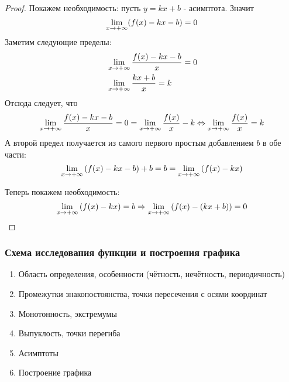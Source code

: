 \begin{proof}
	Покажем необходимость: пусть $y = kx + b$ - асимптота. Значит
	\[
		\lim\limits_{x \to +\infty} (f(x) - kx - b) = 0
	\]
	Заметим следующие пределы:
	\begin{align*}
		&\lim\limits_{x \to +\infty} \frac{f(x) - kx - b}{x} = 0
		\\
		&\lim\limits_{x \to +\infty} \frac{kx + b}{x} = k
	\end{align*}
	Отсюда следует, что
	\[
		\lim\limits_{x \to +\infty} \frac{f(x) - kx - b}{x} = 0 = \lim\limits_{x \to +\infty} \frac{f(x)}{x} - k \Leftrightarrow \lim\limits_{x \to +\infty} \frac{f(x)}{x} = k
	\]
	А второй предел получается из самого первого простым добавлением $b$ в обе части:
	\[
		\lim\limits_{x \to +\infty} \left(f(x) - kx - b\right) + b = b = \lim\limits_{x \to +\infty} \left(f(x) - kx\right)
	\]
	
	Теперь покажем необходимость:
	\[
		\lim\limits_{x \to +\infty} \left(f(x) - kx\right) = b \Rightarrow \lim\limits_{x \to +\infty} \left(f(x) - (kx + b)\right) = 0
	\]
\end{proof}

\subsubsection*{Схема исследования функции и построения графика}

\begin{enumerate}
	\item Область определения, особенности (чётность, нечётность, периодичность)
	
	\item Промежутки знакопостоянства, точки пересечения с осями координат
	
	\item Монотонность, экстремумы
	
	\item Выпуклость, точки перегиба
	
	\item Асимптоты
	
	\item Построение графика
\end{enumerate}

